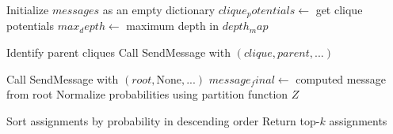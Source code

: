 \documentclass[a4paper,12pt]{article}
\begin{document}
\begin{algorithm}
\begin{algorithmic}[1]
    \State Initialize $messages$ as an empty dictionary
    \State $clique_potentials \gets$ get clique potentials
    \State $max_depth \gets$ maximum depth in $depth_map$
    
    \State Identify parent cliques
    \State Call SendMessage with $(clique, parent, ...)$
    \EndFor
    \EndFor
    \EndFor
    
    \State Call SendMessage with $(root, \text{None}, ...)$
    \State $message_final \gets$ computed message from root
    \State Normalize probabilities using partition function $Z$
    
    \State Sort assignments by probability in descending order
    \State Return top-$k$ assignments
    
    \end{algorithmic}
    \end{algorithm}
\end{document}
